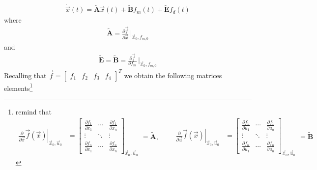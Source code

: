 \documentclass[12pt,a4paper,oneside]{book}
\begin{document}
\begin{onehalfspace}
\begin{equation}\label{pendulum_on_cart_11}
	\begin{aligned}
		\dot{\vec{x}}(t)=\tilde{\mathbf{A}}\vec{x}(t)+\tilde{\mathbf{B}}f_m(t)+\tilde{\mathbf{E}}f_d(t)
	\end{aligned}
\end{equation}
where
\begin{equation}\label{pendulum_on_cart_12}
	\begin{aligned}
		\tilde{\mathbf{A}}=\frac{\partial\vec{f}}{\partial\vec{x}}\,\Big|_{\vec{x}_0,f_{m,0}}
	\end{aligned}
\end{equation}
and
\begin{equation}\label{pendulum_on_cart_13}
	\begin{aligned}
		\tilde{\mathbf{E}}=\tilde{\mathbf{B}}=\frac{\partial\vec{f}}{\partial f_m}\,\Big|_{\vec{x}_0,f_{m,0}}
	\end{aligned}
\end{equation}
Recalling that $\vec{f}=\begin{bmatrix} f_1&f_2&f_3&f_4\end{bmatrix}^T$ we 
obtain the following matrices elements\footnote{remind that \begin{equation*}
		\begin{aligned}
			\left.\frac{\partial}{\partial 
				\vec{x}}\vec{f}(\vec{x})\right|_{\vec{x}_0,\vec{u}_0} &= 
			\begin{bmatrix} \frac{\partial f_1}{\partial x_1} & \cdots & 
				\frac{\partial f_1}{\partial x_n} \\[6pt]
				\vdots & \ddots & \vdots \\[6pt]
				\frac{\partial f_n}{\partial x_1} & \cdots & \frac{\partial 
					f_n}{\partial x_n}
			\end{bmatrix}_{\vec{x}_0,\vec{u}_0}
		\end{aligned}=\tilde{\mathbf{A}},\qquad
		\begin{aligned}
			\left.\frac{\partial}{\partial 
				\vec{u}}\vec{f}(\vec{x})\right|_{\vec{x}_0,\vec{u}_0} &= 
			\begin{bmatrix} \frac{\partial f_1}{\partial u_1} & \cdots & 
				\frac{\partial f_1}{\partial u_n} \\[6pt]
				\vdots & \ddots & \vdots \\[6pt]
				\frac{\partial f_n}{\partial u_1} & \cdots & \frac{\partial 
					f_n}{\partial u_n}
			\end{bmatrix}_{\vec{x}_0,\vec{u}_0}
		\end{aligned}=\tilde{\mathbf{B}}

\end{equation*}}
\end{onehalfspace}
\end{document}

